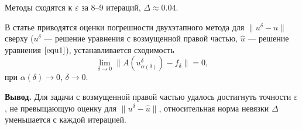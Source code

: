 Методы сходятся к $\varepsilon$ за 8--9 итераций, $\Delta\approx 0.04$.

В статье \cite{VasSkur2017} приводятся оценки погрешности двухэтапного метода для $\|u^{\delta}-\hat{u}\|$ сверху ($u^{\delta}$ --- решение уравнения с возмущенной правой частью, $\hat{u}$ --- решение уравнения $\eqref{equ1}$), устанавливается сходимость $$\lim_{\delta\to 0}\|A(u_{\alpha(\delta)}^{\delta})-f_\delta\|=0,$$ при $\alpha(\delta)\to 0$, $\delta\to 0$. 

{\bfseries\large Вывод.} Для задачи с возмущенной правой частью удалось достигнуть точности $\varepsilon$, не превыщающую оценку для $\|u^{\delta}-\hat{u}\|$, относительная норма невязки $\Delta$ уменьшается с каждой итерацией. 

